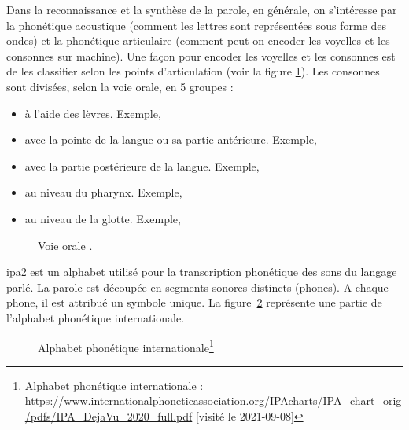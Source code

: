 \documentclass{KodeBook}
\begin{document}
Dans la reconnaissance et la synthèse de la parole, en générale, on s'intéresse par la phonétique acoustique (comment les lettres sont représentées sous forme des ondes) et la phonétique articulaire (comment peut-on encoder les voyelles et les consonnes sur machine).
Une façon pour encoder les voyelles et les consonnes est de les classifier selon les points d'articulation (voir la figure \ref{fig:articulation}). 
Les consonnes sont divisées, selon la voie orale, en 5 groupes :
\begin{itemize}
	\item {} à l'aide des lèvres. Exemple, \expword{\textipa{[b], [p], [m], [f], [v]}}
	\item {} avec la pointe de la langue ou sa partie antérieure. 
	Exemple, 
	\item {} avec la partie postérieure de la langue. Exemple, 
	\item {} au niveau du pharynx. 
	Exemple, 
	\item {} au niveau de la glotte. 
	Exemple, 
\end{itemize}

\begin{figure}[ht]
	\centering 
	\caption[Voie orale]{Voie orale \cite{2009-ball}. \label{fig:articulation}}
\end{figure}

\ac{ipa2} est un alphabet utilisé pour la transcription phonétique des sons du langage parlé.  
La parole est découpée en segments sonores distincts (phones). 
A chaque phone, il est attribué un symbole unique. 
La figure~\ref{fig:ipa} représente une partie de l'alphabet phonétique internationale.

\begin{figure}[ht]
	\centering 
	\caption[Alphabet phonétique internationale : IPA]{Alphabet phonétique internationale\footnote{Alphabet phonétique internationale : \url{https://www.internationalphoneticassociation.org/IPAcharts/IPA_chart_orig/pdfs/IPA_DejaVu_2020_full.pdf} [visité le 2021-09-08]}}
	\label{fig:ipa}
\end{figure}
\end{document}
